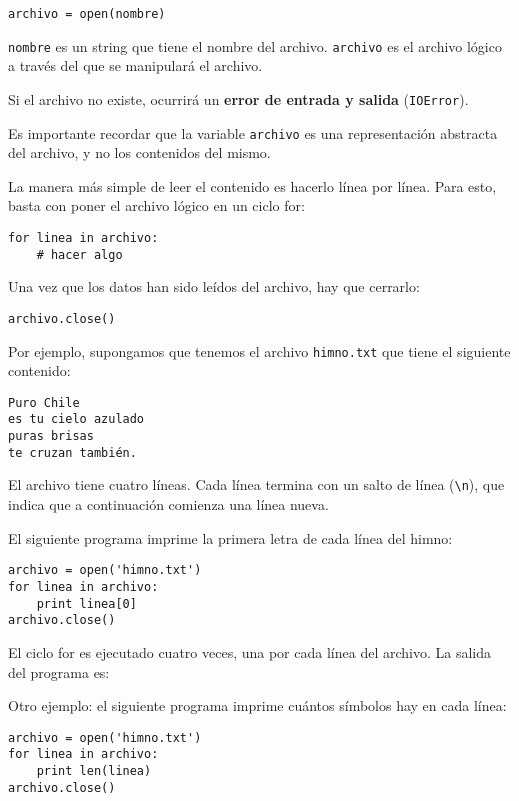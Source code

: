\begin{lstlisting}
archivo = open(nombre)
\end{lstlisting}

\lstinline!nombre! es un string que tiene el nombre del archivo.
\lstinline!archivo! es el archivo lógico a través del que se manipulará
el archivo.

Si el archivo no existe, ocurrirá un \textbf{error de entrada y salida}
(\lstinline!IOError!).

Es importante recordar que la variable \lstinline!archivo! es una
representación abstracta del archivo, y no los contenidos del mismo.

La manera más simple de leer el contenido es hacerlo línea por línea.
Para esto, basta con poner el archivo lógico en un ciclo for:

\begin{lstlisting}
for linea in archivo:
    # hacer algo
\end{lstlisting}

Una vez que los datos han sido leídos del archivo, hay que cerrarlo:

\begin{lstlisting}
archivo.close()
\end{lstlisting}

Por ejemplo, supongamos que tenemos el archivo \lstinline!himno.txt! que
tiene el siguiente contenido:

\begin{lstlisting}
Puro Chile
es tu cielo azulado
puras brisas
te cruzan también.
\end{lstlisting}

El archivo tiene cuatro líneas. Cada línea termina con un salto de línea
(\lstinline!\n!), que indica que a continuación comienza una línea
nueva.

El siguiente programa imprime la primera letra de cada línea del himno:

\begin{lstlisting}
archivo = open('himno.txt')
for linea in archivo:
    print linea[0]
archivo.close()
\end{lstlisting}

El ciclo for es ejecutado cuatro veces, una por cada línea del archivo.
La salida del programa es:

Otro ejemplo: el siguiente programa imprime cuántos símbolos hay en cada
línea:

\begin{lstlisting}
archivo = open('himno.txt')
for linea in archivo:
    print len(linea)
archivo.close()
\end{lstlisting}

